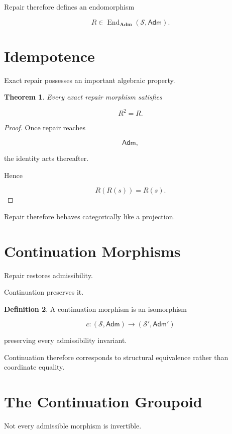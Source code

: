 \documentclass[11pt,oneside]{book}
\numberwithin{equation}{chapter}
\theoremstyle{definition}
\newtheorem{definition}{Definition}[chapter]
\theoremstyle{plain}
\newtheorem{theorem}[definition]{Theorem}
\DeclareMathOperator{\End}{End}
\newcommand{\State}{\mathcal{S}}
\newcommand{\Adm}{\mathsf{Adm}}
\begin{document}
Repair therefore defines an endomorphism

\[
R
\in
\End_{\mathbf{Adm}}(\State,\Adm).
\]

\section{Idempotence}

Exact repair possesses an important algebraic property.

\begin{theorem}

Every exact repair morphism satisfies

\[
R^2=R.
\]

\end{theorem}

\begin{proof}

Once repair reaches

\[
\Adm,
\]

the identity acts thereafter.

Hence

\[
R(R(s))
=
R(s).
\]

\end{proof}

Repair therefore behaves categorically like a projection.

\section{Continuation Morphisms}

Repair restores admissibility.

Continuation preserves it.

\begin{definition}

A continuation morphism is an isomorphism

\[
c:
(\State,\Adm)
\rightarrow
(\State',\Adm')
\]

preserving every admissibility invariant.

\end{definition}

Continuation therefore corresponds to structural equivalence rather than
coordinate equality.

\section{The Continuation Groupoid}

Not every admissible morphism is invertible.
\end{document}
